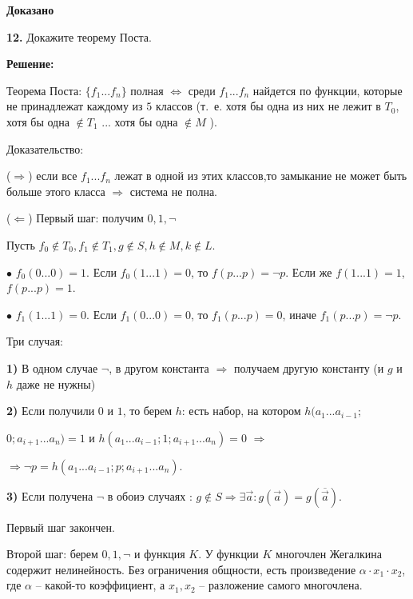 \documentclass[a4paper,12pt]{article} %
\begin{document}
\begin{flushright}
\begin{large}
\textbf {Доказано}
\end{large}
\end{flushright}

{\bf 12.} Докажите теорему Поста.
\begin{center}
\bfseries
{\Large Решение: }
\end{center}

Теорема Поста: $\{f_1 ... f_n \}$ полная $\Leftrightarrow$ среди $f_1 ... f_n$ найдется по функции, которые не принадлежат каждому из $5$ классов (т.~е. хотя бы одна из них не лежит в $T_0$, хотя бы одна $\notin T_1$ ... хотя бы одна $\notin M$ ). 

Доказательство:

($\Rightarrow$) если все $f_1 ... f_n$ лежат в одной из этих классов,то замыкание не может быть больше этого класса $\Rightarrow$ система не полна.

($\Leftarrow$) Первый шаг: получим $0,1, \neg$ 

Пусть $f_0 \notin T_0, f_1 \notin T_1, g \notin S, h \notin M, k \notin L$.

$\bullet$ $f_0 (0...0) = 1$. Если $f_0(1...1) = 0$, то $f(p...p) = \neg p$. Если же $f(1...1) = 1$, $f(p...p) = 1$.

$\bullet$ $f_1 (1...1) = 0$. Если $f_1(0...0) = 0$, то $f_1(p...p) = 0$, иначе $f_1(p...p) = \neg p$.

Три случая: 

{\bf 1)} В одном случае $\neg$, в другом константа $\Rightarrow$ получаем другую константу (и $g$ и $h$ даже не нужны)

{\bf 2)} Если получили $0$ и $1$, то берем $h$: есть набор, на котором $h(a_1... a_{i - 1};$

$0;a_{i+ 1}... a_n)  = 1$ и $h(a_1... a_{i - 1};1;a_{i+ 1}... a_n)  = 0$ $\Rightarrow$

$\Rightarrow \neg p = h(a_1...a_{i - 1};p;a_{i + 1}...a_n).$

{\bf 3)} Если получена $\neg$ в обоиэ случаях : $g \notin S \Rightarrow \exists \vec{a}: g(\vec{a}) = g (\overline{\vec{{a}}})$.

Первый шаг закончен.

Второй шаг: берем $0,1,\neg$ и функция $K$. У функции $K$ многочлен Жегалкина содержит нелинейность. Без ограничения общности, есть произведение $\alpha \cdot x_1\cdot x_2$, где $\alpha$ -- какой-то коэффициент, а $x_1,x_2$ -- разложение самого многочлена.
\end{document}
